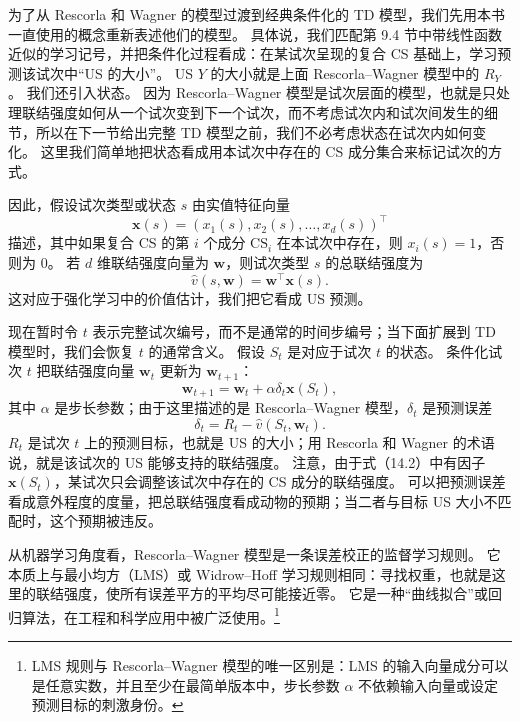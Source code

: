 \documentclass[UTF8, 12pt, fontset=fandol, oneside]{ctexart}
\begin{document}
为了从 Rescorla 和 Wagner 的模型过渡到经典条件化的 TD 模型，我们先用本书一直使用的概念重新表述他们的模型。
具体说，我们匹配第 9.4 节中带线性函数近似的学习记号，并把条件化过程看成：在某试次呈现的复合 CS 基础上，学习预测该试次中“US 的大小”。
US $Y$ 的大小就是上面 Rescorla--Wagner 模型中的 $R_Y$。
我们还引入状态。
因为 Rescorla--Wagner 模型是试次层面的模型，也就是只处理联结强度如何从一个试次变到下一个试次，而不考虑试次内和试次间发生的细节，所以在下一节给出完整 TD 模型之前，我们不必考虑状态在试次内如何变化。
这里我们简单地把状态看成用本试次中存在的 CS 成分集合来标记试次的方式。

因此，假设试次类型或状态 $s$ 由实值特征向量
\[
\mathbf{x}(s)=(x_1(s),x_2(s),\ldots,x_d(s))^\top
\]
描述，其中如果复合 CS 的第 $i$ 个成分 $\mathrm{CS}_i$ 在本试次中存在，则 $x_i(s)=1$，否则为 $0$。
若 $d$ 维联结强度向量为 $\mathbf{w}$，则试次类型 $s$ 的总联结强度为
\begin{equation}
\hat v(s,\mathbf{w})=\mathbf{w}^\top\mathbf{x}(s).
\tag{14.1}
\end{equation}
这对应于强化学习中的价值估计，我们把它看成 US 预测。

现在暂时令 $t$ 表示完整试次编号，而不是通常的时间步编号；当下面扩展到 TD 模型时，我们会恢复 $t$ 的通常含义。
假设 $S_t$ 是对应于试次 $t$ 的状态。
条件化试次 $t$ 把联结强度向量 $\mathbf{w}_t$ 更新为 $\mathbf{w}_{t+1}$：
\begin{equation}
\mathbf{w}_{t+1}=\mathbf{w}_t+\alpha\delta_t\mathbf{x}(S_t),
\tag{14.2}
\end{equation}
其中 $\alpha$ 是步长参数；由于这里描述的是 Rescorla--Wagner 模型，$\delta_t$ 是预测误差
\begin{equation}
\delta_t=R_t-\hat v(S_t,\mathbf{w}_t).
\tag{14.3}
\end{equation}
$R_t$ 是试次 $t$ 上的预测目标，也就是 US 的大小；用 Rescorla 和 Wagner 的术语说，就是该试次的 US 能够支持的联结强度。
注意，由于式（14.2）中有因子 $\mathbf{x}(S_t)$，某试次只会调整该试次中存在的 CS 成分的联结强度。
可以把预测误差看成意外程度的度量，把总联结强度看成动物的预期；当二者与目标 US 大小不匹配时，这个预期被违反。

从机器学习角度看，Rescorla--Wagner 模型是一条误差校正的监督学习规则。
它本质上与最小均方（LMS）或 Widrow--Hoff 学习规则相同：寻找权重，也就是这里的联结强度，使所有误差平方的平均尽可能接近零。
它是一种“曲线拟合”或回归算法，在工程和科学应用中被广泛使用。\footnote{LMS 规则与 Rescorla--Wagner 模型的唯一区别是：LMS 的输入向量成分可以是任意实数，并且至少在最简单版本中，步长参数 $\alpha$ 不依赖输入向量或设定预测目标的刺激身份。}
\end{document}
